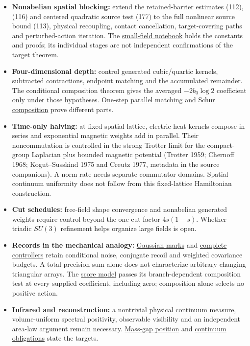 \documentclass[11pt,a4paper]{article}
\newcommand{\tightlist}{\setlength{\itemsep}{0pt}\setlength{\parskip}{0pt}}
\begin{document}
\begin{itemize}
\tightlist
\item
  \textbf{Nonabelian spatial blocking:} extend the retained-barrier
  estimates (112), (116) and centered quadratic source test (177) to the
  full nonlinear source bound (113), physical recoupling, contact
  cancellation, target-covering paths and perturbed-action iteration.
  The \href{su2-midplane-small-field.md}{small-field notebook} holds the
  constants and proofs; its individual stages are not independent
  confirmations of the target theorem.
\item
  \textbf{Four-dimensional depth:} control generated cubic/quartic
  kernels, subtracted contractions, endpoint matching and the
  accumulated remainder. The conditional composition theorem gives the
  averaged \(-2b_0\log2\) coefficient only under those hypotheses.
  \href{four-dimensional-parallel-log.md}{One-step parallel matching}
  and \href{four-dimensional-composition.md}{Schur composition} prove
  different parts.
\item
  \textbf{Time-only halving:} at fixed spatial lattice, electric heat
  kernels compose in series and exponential magnetic weights add in
  parallel. Their noncommutation is controlled in the strong Trotter
  limit for the compact-group Laplacian plus bounded magnetic potential
  (Trotter 1959; Chernoff 1968; Kogut--Susskind 1975 and Creutz 1977,
  metadata in the source companions). A norm rate needs separate
  commutator domains. Spatial continuum uniformity does not follow from
  this fixed-lattice Hamiltonian construction.
\item
  \textbf{Cut schedules:} free-field shape convergence and nonabelian
  generated weights require control beyond the one-cut factor
  \(4s(1-s)\). Whether triadic \(SU(3)\) refinement helps organize large
  fields is open.
\item
  \textbf{Records in the mechanical analogy:}
  \href{mark-cost-and-statistical-floor.md}{Gaussian marks} and
  \href{sed-closure-under-recording.md}{complete controllers} retain
  conditional noise, conjugate recoil and weighted covariance budgets. A
  total precision sum alone does not characterize arbitrary changing
  triangular arrays. The \href{score-constrained-ensemble.md}{score
  model} passes its branch-dependent composition test at every supplied
  coefficient, including zero; composition alone selects no positive
  action.
\item
  \textbf{Infrared and reconstruction:} a nontrivial physical continuum
  measure, volume-uniform spectral positivity, observable visibility and
  an independent area-law argument remain necessary.
  \href{mass-gap-obligations-lattice.md\#existing-estimates-and-examined-routes}{Mass-gap
  position} and \href{mass-gap-obligations-lattice.md}{continuum
  obligations} state the targets.
\end{itemize}
\end{document}
